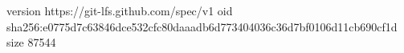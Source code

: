 version https://git-lfs.github.com/spec/v1
oid sha256:e0775d7c63846dce532cfc80daaadb6d773404036c36d7bf0106d11cb690cf1d
size 87544
